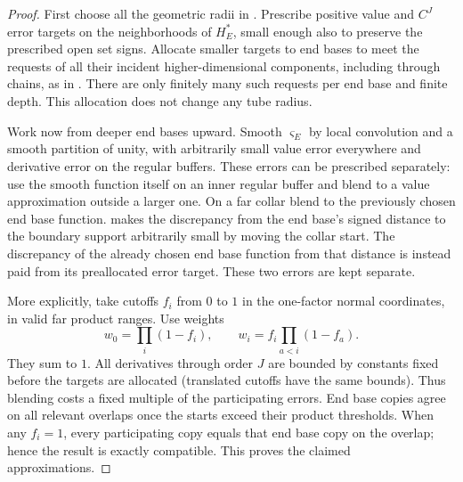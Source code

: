 \begin{proof}
First choose all the geometric radii in .  Prescribe
positive value and $C^J$ error targets on the neighborhoods of $H_E^*$, small
enough also to preserve the prescribed open set signs.  Allocate smaller targets to
end bases to meet the requests of all their incident higher-dimensional components, including through
chains, as in .  There are only finitely many
such requests per end base and finite depth.  This allocation does not
change any tube radius.

Work now from deeper end bases upward.  Smooth $\varsigma_E$ by local
convolution and a smooth partition of unity, with arbitrarily small
value error everywhere and derivative error on the regular buffers.
These errors can be prescribed separately: use the smooth function
itself on an inner regular buffer and blend to a value approximation
outside a larger one.  On a far collar blend to the previously chosen
end base function.   makes the discrepancy from the
end base's signed distance to the boundary support arbitrarily small by moving the collar
start.  The discrepancy of the already chosen end base function from that
distance is instead paid from its preallocated error target.  These
two errors are kept separate.

More explicitly, take cutoffs $f_i$ from $0$ to $1$ in the one-factor
normal coordinates, in valid far product ranges.  Use weights
\[
 w_0=\prod_i(1-f_i),\qquad
 w_i=f_i\prod_{a<i}(1-f_a).
\]
They sum to $1$.  All derivatives through order $J$ are bounded by
constants fixed before the targets are allocated (translated cutoffs
have the same bounds).  Thus blending costs a fixed multiple of the
participating errors.  End base copies agree on all relevant overlaps once
the starts exceed their product thresholds.  When any $f_i=1$, every
participating copy equals that end base copy on the overlap; hence the
result is exactly compatible.  This proves the claimed approximations.


\end{proof}
